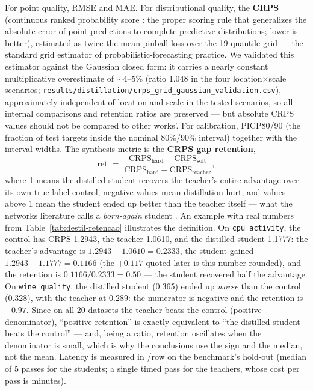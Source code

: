 For point quality, RMSE and MAE. For distributional quality, the
\textbf{CRPS} (continuous ranked probability score
\citep{gneiting2007}: the proper scoring rule that generalizes the
absolute error of point predictions to complete predictive
distributions; lower is better), estimated as twice the mean pinball
loss over the 19-quantile grid \citep{gneiting2011} --- the standard
grid estimator of probabilistic-forecasting practice. We validated
this estimator against the Gaussian closed form: it carries a nearly
constant multiplicative overestimate of ${\sim}4$--5\% (ratio 1.048
in the four location$\times$scale scenarios;
\texttt{results/\allowbreak distillation/\allowbreak crps\_\allowbreak grid\_\allowbreak gaussian\_\allowbreak validation.\allowbreak csv}),
approximately independent of location and scale in the tested
scenarios, so all internal comparisons and retention ratios are
preserved --- but absolute CRPS values should not be compared to
other works'. For calibration, PICP80/90 (the fraction of test
targets inside the nominal 80\%/90\% interval) together with the
interval widths. The synthesis metric is the \textbf{CRPS gap
retention},
\begin{equation}
  \mathrm{ret} \;=\;
  \frac{\mathrm{CRPS}_{\mathrm{hard}} - \mathrm{CRPS}_{\mathrm{soft}}}
       {\mathrm{CRPS}_{\mathrm{hard}} - \mathrm{CRPS}_{\mathrm{teacher}}},
\label{eq:destil-retencao}
\end{equation}
where 1 means the distilled student recovers the teacher's entire
advantage over its own true-label control, negative values mean
distillation hurt, and values above 1 mean the student ended up
better than the teacher itself --- what the networks literature
calls a \emph{born-again} student \citep{furlanello2018}. An example
with real numbers from Table~\ref{tab:destil-retencao} illustrates the
definition. On \texttt{cpu\_activity}, the control has CRPS 1.2943, the
teacher 1.0610, and the distilled student 1.1777: the teacher's
advantage is $1.2943-1.0610=0.2333$, the student gained
$1.2943-1.1777=0.1166$ (the $+0.117$ quoted later is this number
rounded), and the retention is $0.1166/0.2333=0.50$ --- the
student recovered half the advantage. On \texttt{wine\_quality}, the
distilled student (0.365) ended up \emph{worse} than the control
(0.328), with the teacher at 0.289: the numerator is negative and
the retention is $-0.97$. Since on all 20 datasets the teacher beats
the control (positive denominator), ``positive retention'' is
exactly equivalent to ``the distilled student beats the control''
--- and, being a ratio, retention oscillates when the denominator is
small, which is why the conclusions use the sign and the median, not
the mean. Latency is measured in \us/row on the benchmark's hold-out
(median of 5 passes for the students; a single timed pass for the
teachers, whose cost per pass is minutes).

